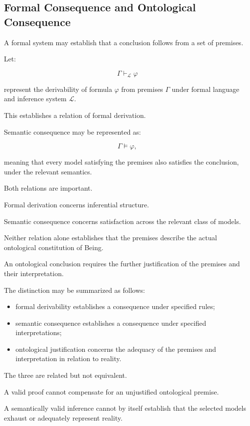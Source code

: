 \subsection{Formal Consequence and Ontological Consequence}

A formal system
may establish that
a conclusion follows
from a set of
premises.

Let:

\[
    \Gamma\vdash_{\mathcal{L}}\varphi
\]

represent the derivability
of formula \(\varphi\)
from premises \(\Gamma\)
under formal language
and inference system
\(\mathcal{L}\).

This establishes
a relation of
formal derivation.

Semantic consequence
may be represented
as:

\[
    \Gamma\models\varphi,
\]

meaning that every
model satisfying
the premises also
satisfies the conclusion,
under the relevant
semantics.

Both relations
are important.

Formal derivation
concerns inferential
structure.

Semantic consequence
concerns satisfaction
across the relevant
class of models.

Neither relation
alone establishes
that the premises
describe the actual
ontological constitution
of Being.

An ontological conclusion
requires the further
justification of
the premises and
their interpretation.

The distinction may
be summarized as follows:

\begin{itemize}
    \item formal derivability
    establishes a
    consequence under
    specified rules;
    \item semantic consequence
    establishes a
    consequence under
    specified interpretations;
    \item ontological justification
    concerns the
    adequacy of the
    premises and
    interpretation
    in relation
    to reality.
\end{itemize}

The three are related
but not equivalent.

A valid proof
cannot compensate
for an unjustified
ontological premise.

A semantically valid
inference cannot
by itself establish
that the selected
models exhaust
or adequately
represent reality.

